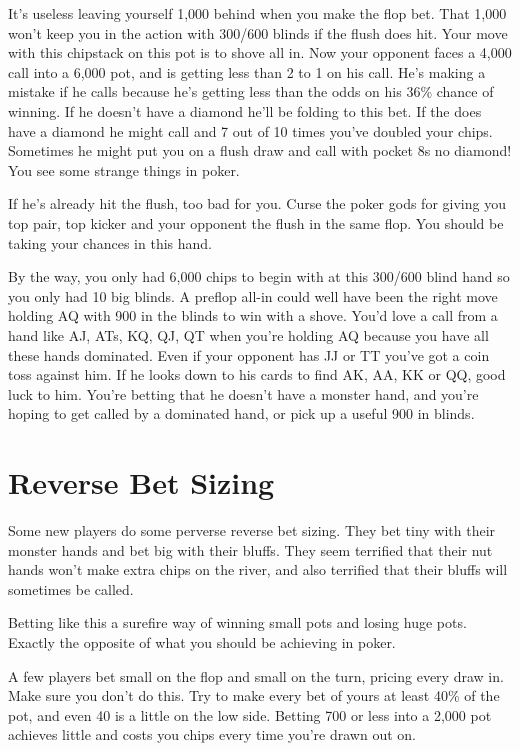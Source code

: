 It's useless leaving yourself 1,000 behind when you make the flop bet.
That 1,000 won't keep you in the action with 300/600 blinds if the
flush does hit. Your move with this chipstack on this pot is to shove
all in. Now your opponent faces a 4,000 call into a 6,000 pot, and is
getting less than 2 to 1 on his call. He's making a mistake if he calls
because he's getting less than the odds on his 36\% chance of winning.
If he doesn't have a diamond he'll be folding to this bet. If the does
have a diamond he might call and 7 out of 10 times you've doubled your chips.
Sometimes he might put you on a flush draw and call with pocket 8s no
diamond! You see some strange things in poker.

If he's already hit the flush, too bad for you. Curse the poker gods
for giving you top pair, top kicker and your opponent the flush in
the same flop. You should be taking your chances in this hand.

By the way, you only had 6,000 chips to begin with at this 300/600 blind
hand so you only had 10 big blinds. A preflop all-in could well have
been the right move holding AQ with 900 in the blinds to win with a shove.
You'd love a call from a hand like AJ, ATs, KQ, QJ, QT when you're holding
AQ because you have all these hands dominated. Even if your opponent
has JJ or TT you've got a coin toss against him. If he looks down to his
cards to find AK, AA, KK or QQ, good luck to him. You're betting that
he doesn't have a monster hand, and you're hoping to get called by a
dominated hand, or pick up a useful 900 in blinds.

\section{Reverse Bet Sizing}

Some new players do some perverse reverse bet sizing. They bet tiny with
their monster hands and bet big with their bluffs. They seem terrified
that their nut hands won't make extra chips on the river, and also terrified
that their bluffs will sometimes be called.

Betting like this a surefire way of winning small pots and losing huge pots.
Exactly the opposite of what you should be achieving in poker.

A few players bet small on the flop and small on the turn, pricing every draw
in. Make sure you don't do this. Try to make every bet of yours at least
40\% of the pot, and even 40 is a little on the low side. Betting 700 or less into
a 2,000 pot achieves little and costs you chips every time you're drawn out
on.

